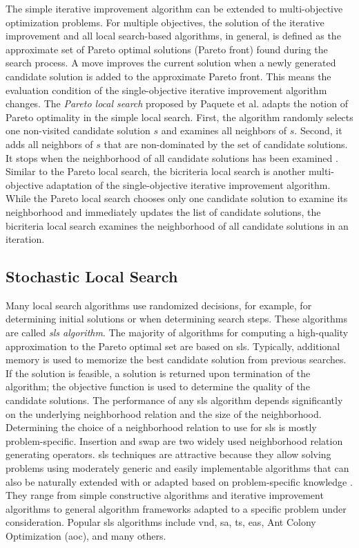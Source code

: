 The simple iterative improvement algorithm can be extended to multi-objective optimization problems. For multiple objectives, the solution of the iterative improvement and all local search-based algorithms, in general, is defined as the approximate set of Pareto optimal solutions (Pareto front) found during the search process. A move improves the current solution when a newly generated candidate solution is added to the approximate Pareto front. This means the evaluation condition of the single-objective iterative improvement algorithm changes.
The \textit{Pareto local search} proposed by Paquete et al. \parencite{Paquete2004ParetoStudy} adapts the notion of Pareto optimality in the simple local search. First, the algorithm randomly selects one non-visited candidate solution $s$ and examines all neighbors of $s$. Second, it adds all neighbors of $s$ that are non-dominated by the set of candidate solutions. It stops when the neighborhood of all candidate solutions has been examined \parencite{Gonzalez2007HandbookMetaheuristics}. Similar to the Pareto local search, the bicriteria local search \parencite{Angel2004ApproximatingProblem} is another multi-objective adaptation of the single-objective iterative improvement algorithm. While the Pareto local search chooses only one candidate solution to examine its neighborhood and immediately updates the list of candidate solutions, the bicriteria local search examines the neighborhood of all candidate solutions in an iteration.



   
\subsection{Stochastic Local Search}
Many local search algorithms use randomized decisions, for example, for determining initial solutions or when determining search steps. These algorithms are called \textit{\gls{sls} algorithm}. The majority of algorithms for computing a high-quality approximation to the Pareto optimal set are based on \gls{sls}. Typically, additional memory is used to memorize the best candidate solution from previous searches. If the solution is feasible, a solution is returned upon termination of the algorithm; the objective function is used to determine the quality of the candidate solutions. 
The performance of any \gls{sls} algorithm depends significantly on the underlying neighborhood relation and the size of the neighborhood. Determining the choice of a neighborhood relation to use for \gls{sls} is mostly problem-specific. Insertion and swap are two widely used neighborhood relation generating operators. 
\Gls{sls} techniques are attractive because they allow solving problems using moderately generic and easily implementable algorithms that can also be naturally extended with or adapted based on problem-specific knowledge \parencite{HolgerH2013StochasticApplications}. They range from simple constructive algorithms and iterative improvement algorithms to general algorithm frameworks adapted to a specific problem under consideration. Popular \gls{sls} algorithms include \gls{vnd}, \gls{sa}, \gls{ts}, \glspl{ea}, Ant Colony Optimization (\gls{aoc}), and many others. 

